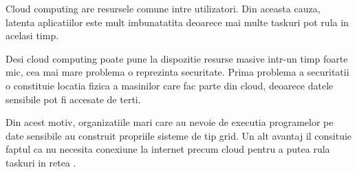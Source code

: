 Cloud computing are resursele comune intre utilizatori. Din aceasta cauza, latenta aplicatiilor
este mult imbunatatita deoarece mai multe taskuri pot rula in acelasi timp. 


Desi cloud computing poate pune la dispozitie resurse masive intr-un timp foarte mic, cea mai mare
problema o reprezinta securitate. Prima problema a securitatii o constituie locatia fizica a
masinilor care fac parte din cloud, deoarece datele sensibile pot fi accesate de terti. 

Din acest motiv, organizatiile mari care au nevoie de executia programelor pe date sensibile au
construit propriile sisteme de tip grid. Un alt avantaj il consituie faptul ca nu necesita
conexiune la internet precum cloud pentru a putea rula taskuri in retea \cite{rings2009grid}.


